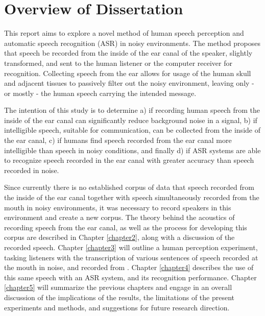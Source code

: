 \section{Overview of Dissertation}\label{ch1:diss-overview}

This report aims to explore a novel method of human speech perception and automatic speech recognition (ASR) in noisy environments.  The method proposes that speech be recorded from the inside of the ear canal of the speaker, slightly transformed, and sent to the human listener or the computer receiver for recognition.  Collecting speech from the ear allows for usage of the human skull and adjacent tissues to passively filter out the noisy environment, leaving only - or mostly - the human speech carrying the intended message.  

The intention of this study is to determine a) if recording human speech from the inside of the ear canal can significantly reduce background noise in a signal, b) if intelligible speech, suitable for communication, can be collected from the inside of the ear canal, c) if humans find speech recorded from the ear canal more intelligible than speech in noisy conditions, and finally d) if ASR systems are able to recognize speech recorded in the ear canal with greater accuracy than speech recorded in noise.

Since currently there is no established corpus of data that \DIFdelbegin {}\DIFdelend \DIFaddbegin {}\DIFaddend speech recorded from the inside of the ear canal together with speech simultaneously recorded from the mouth in noisy environments, it was necessary to record \DIFaddbegin {}\DIFaddend speakers in this environment and create a new corpus.  The theory behind the acoustics of recording speech from the ear canal, as well as the process for developing this corpus are described in Chapter \ref{chapter2}, along with a discussion of the recorded speech.  Chapter \ref{chapter3} will outline a human perception experiment, tasking listeners with the transcription of various sentences of speech recorded at the mouth in noise\DIFdelbegin {}\DIFdelend , and recorded from \DIFdelbegin {}\DIFdelend \DIFaddbegin {}\DIFaddend .   Chapter \ref{chapter4} describes the use of this same speech with an ASR system, and its recognition performance.  Chapter \ref{chapter5} will summarize the previous chapters and engage in an overall discussion of the implications of the results, the limitations of the present experiments and methods, and suggestions for future research direction.


